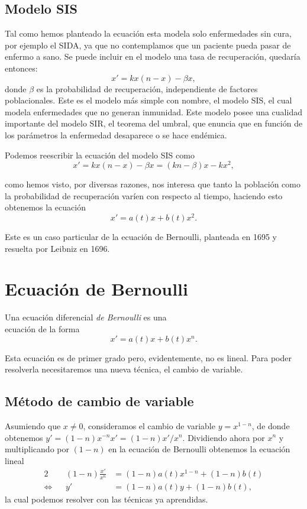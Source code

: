 \documentclass[../ecuaciones_diferenciales.tex]{subfiles}
\begin{document}
\subsection{Modelo SIS}

Tal como hemos planteado la ecuación esta modela solo enfermedades sin cura, por
ejemplo el SIDA, ya que no contemplamos que un paciente pueda pasar de enfermo a
sano. Se puede incluir en el modelo una tasa de recuperación, quedaría entonces:
\[x' = k x(n - x) - \beta x,\]
donde \(\beta\) es la probabilidad de recuperación, independiente de factores
poblacionales. Este es el modelo más simple con nombre, el modelo SIS, el cual
modela enfermedades que no generan inmunidad. Este modelo posee una cualidad
importante del modelo SIR, el teorema del umbral, que enuncia que en función de
los parámetros la enfermedad desaparece o se hace endémica.

Podemos reescribir la ecuación del modelo SIS como
\[x' = k x(n - x) - \beta x = (kn - \beta)x - kx^2,\]

como hemos visto, por diversas razones, nos interesa que tanto la población como
la probabilidad de recuperación varíen con respecto al tiempo, haciendo esto
obtenemos la ecuación
\[x' = a(t)x + b(t)x^2.\]

Este es un caso particular de la ecuación de Bernoulli, planteada en 1695 y
resuelta por Leibniz en 1696.

\section{Ecuación de Bernoulli}

\begin{definition}
	Una ecuación diferencial \emph{de Bernoulli} es una \\ %
	ecuación de la forma
	\[x' = a(t)x + b(t)x^n.\]
\end{definition}

Esta ecuación es de primer grado pero, evidentemente, no es lineal. Para poder
resolverla necesitaremos una nueva técnica, el cambio de variable.

\subsection{Método de cambio de variable}

Asumiendo que \(x \neq 0\), consideramos el cambio de variable
\(y = x^{1 - n}\), de donde obtenemos
\(y' = (1 - n) x^{-n} x' = (1 - n)x'/x^n\). Dividiendo ahora por \(x^n\) y
multiplicando por \((1 - n)\) en la ecuación de Bernoulli obtenemos la ecuación
lineal
\begin{alignat*}{2}
	     &  & (1 - n)\frac{x'}{x^n} & = (1-n)a(t)x^{1-n} + (1-n)b(t) \\
	\iff &  & y'                    & = (1 - n)a(t)y + (1 - n)b(t),
\end{alignat*}
la cual podemos resolver con las técnicas ya aprendidas.
\end{document}
